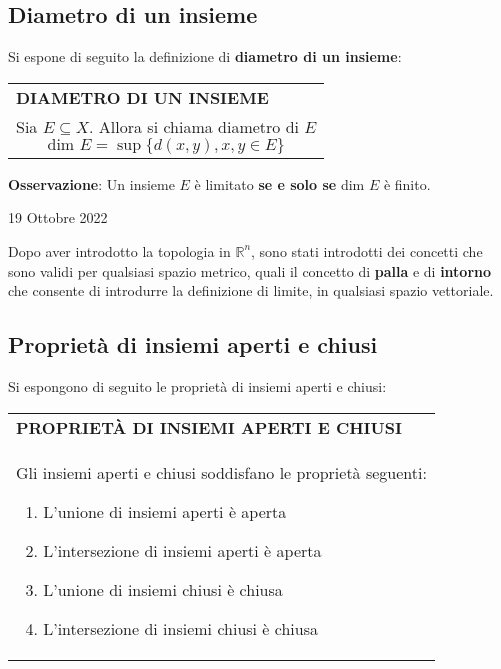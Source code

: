 \documentclass[a4paper]{extarticle}
\renewcommand\arraystretch{}
\begin{document}
\vspace{1em}
\noindent
\subsection{Diametro di un insieme}
Si espone di seguito la definizione di \textbf{diametro di un insieme}:

\vspace{1em}
\setlength{\tabcolsep}{14pt}
\renewcommand{\arraystretch}{2}
\noindent
\begin{tabularx}{\textwidth}{@{}|P|@{}}
    \hline
    {\textbf{DIAMETRO DI UN INSIEME}}\\
    \parbox{\linewidth}{Sia $E \subseteq X$. Allora si chiama diametro di $E$
    \[\text{dim } E = \sup \{d(x,y), x,y \in E\}\]
    \vspace{-1mm}}\\
    \hline
\end{tabularx}

\vspace{2em}
\noindent
\textbf{Osservazione}: Un insieme $E$ è limitato \textbf{se e solo se} dim $E$ è finito.

\newpage
\begin{center}
    19 Ottobre 2022
\end{center}
Dopo aver introdotto la topologia in $\mathbb{R}^n$, sono stati introdotti dei concetti che sono validi per qualsiasi spazio metrico, quali il concetto di \textbf{palla} e di \textbf{intorno} che consente di introdurre la definizione di limite, in qualsiasi spazio vettoriale.

\vspace{1em}
\noindent
\subsection{Proprietà di insiemi aperti e chiusi}
Si espongono di seguito le proprietà di insiemi aperti e chiusi:

\vspace{1em}
\setlength{\tabcolsep}{14pt}
\renewcommand{\arraystretch}{2}
\noindent
\begin{tabularx}{\textwidth}{@{}|P|@{}}
    \hline
    {\textbf{PROPRIETÀ DI INSIEMI APERTI E CHIUSI}}\\
    \parbox{\linewidth}{Gli insiemi aperti e chiusi soddisfano le proprietà seguenti:
    \begin{enumerate}
        \item L'unione di insiemi aperti è aperta
        \item L'intersezione di insiemi aperti è aperta
        \item L'unione di insiemi chiusi è chiusa
        \item L'intersezione di insiemi chiusi è chiusa
    \end{enumerate}
    \vspace{1mm}}\\
    \hline
\end{tabularx}
\end{document}
